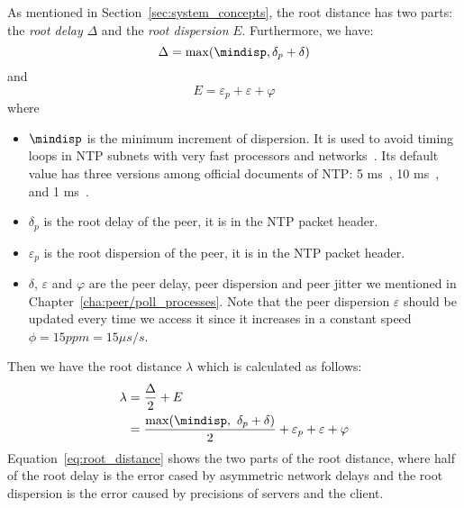 As mentioned in Section~\ref{sec:system_concepts}, the root distance has two
parts: the \emph{root delay} $\Delta$ and the \emph{root dispersion} $E$.
Furthermore, we have: 
\begin{equation}
    \Delta = \max(\mindisp, \delta_p + \delta)
    \label{eq:root_delay}
\end{equation}
and
\begin{equation}
    E = \varepsilon_p + \varepsilon + \varphi
    \label{eq:root_dispersion}
\end{equation}
where 
\begin{itemize}
    \item $\mindisp$ is the minimum increment of dispersion. It is used to
        avoid timing loops in NTP subnets with very fast processors and
        networks~\cite{rfc5905}. Its default value has three versions among
        official documents of NTP: 5 ms~\cite{rfc5905}, 10 ms~\cite{rfc5905},
        and 1 ms~\cite{performance_metrics}.
    \item $\delta_p$ is the root delay of the peer, it is in the NTP packet
        header.
    \item $\varepsilon_p$ is the root dispersion of the peer, it is in the NTP
        packet header.
    \item $\delta$, $\varepsilon$ and $\varphi$ are the peer delay, peer
        dispersion and peer jitter we mentioned in
        Chapter~\ref{cha:peer/poll_processes}. Note that the peer dispersion
        $\varepsilon$ should be updated every time we access it since it
        increases in a constant speed $\phi = 15 ppm = 15 \mu s/s$.
\end{itemize}
Then we have the root distance $\lambda$ which is calculated as follows:
\begin{align}
    \lambda & = \frac{\Delta}{2} + E\\
    & =\frac{\max(\mindisp,\ \delta_p + \delta)}{2} 
    + \varepsilon_p + \varepsilon + \varphi
    \label{eq:root_distance}
\end{align}
Equation~\ref{eq:root_distance} shows the two parts of the root distance, where
half of the root delay is the error cased by asymmetric network delays and the
root dispersion is the error caused by precisions of servers and the client.

